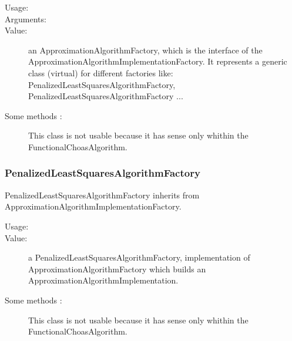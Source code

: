 \begin{description}
\item[Usage:] \rule{0pt}{1em}

\item[Arguments:] \rule{0pt}{1em}


\item[Value:] an ApproximationAlgorithmFactory, which is the interface of the ApproximationAlgorithmImplementationFactory. It represents a generic class (virtual) for different factories like: PenalizedLeastSquaresAlgorithmFactory, PenalizedLeastSquaresAlgorithmFactory ...

\item[Some methods :] This class is not usable because it has sense only whithin the FunctionalChoasAlgorithm.

\end{description}


\newpage
\subsubsection{PenalizedLeastSquaresAlgorithmFactory}

PenalizedLeastSquaresAlgorithmFactory inherits from ApproximationAlgorithmImplementationFactory.

\begin{description}
\item[Usage:] \rule{0pt}{1em}

\item[Value:] a PenalizedLeastSquaresAlgorithmFactory, implementation of ApproximationAlgorithmFactory which builds an ApproximationAlgorithmImplementation.

\item[Some methods :]  This class is not usable because it has sense only whithin the FunctionalChoasAlgorithm.

\end{description}



